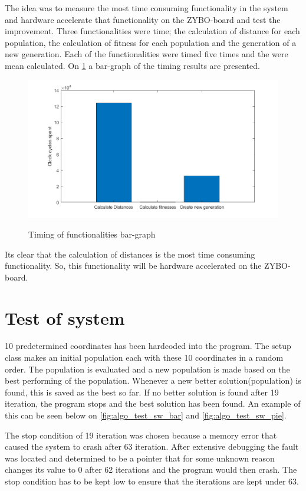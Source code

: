 The idea was to measure the most time consuming functionality in the system and hardware accelerate that functionality on the ZYBO-board and test the improvement. Three functionalities were time; the calculation of distance for each population, the calculation of fitness for each population and the generation of a new generation. Each of the functionalities were timed five times and the were mean calculated. On \cref{fig:timing_barGraph} a bar-graph of the timing results are presented. 

\begin{figure}[H]
	\centering
	{\includegraphics[width=\textwidth]{Images/timing_barGraph.png}}\\[0.5cm]
	\caption{Timing of functionalities bar-graph}
	\label{fig:timing_barGraph}
\end{figure}

Its clear that the calculation of distances is the most time consuming functionality. So, this functionality will be hardware accelerated on the ZYBO-board.


\section{Test of system}
10 predetermined coordinates has been hardcoded into the program. The setup class makes an initial population each with these 10 coordinates in a random order. The population is evaluated and a new population is made based on the best performing of the population. Whenever a new better solution(population) is found, this is saved as the best so far. If no better solution is found after 19 iteration, the program stops and the best solution has been found. An example of this can be seen below on \cref{fig:algo_test_sw_bar} and \cref{fig:algo_test_sw_pie}.

The stop condition of 19 iteration was chosen because a memory error that caused the system to crash after 63 iteration. After extensive debugging the fault was located and determined to be a pointer that for some unknown reason changes its value to 0 after 62 iterations and the program would then crash. The stop condition has to be kept low to ensure that the iterations are kept under 63.

